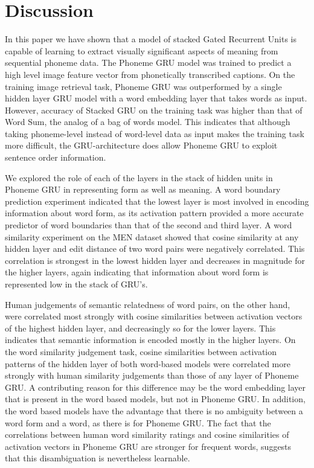 \section{Discussion}
\label{sec:discussion}
In this paper we have shown that a model of stacked Gated Recurrent Units is capable of learning to extract visually significant aspects of meaning from sequential phoneme data. The {\sc Phoneme GRU} model was trained to predict a high level image feature vector from phonetically transcribed captions. On the training image retrieval task, {\sc Phoneme GRU} was outperformed by a single hidden layer GRU model with a word embedding layer that takes words as input. However, accuracy of {\sc Stacked GRU} on the training task was higher than that of {\sc Word Sum}, the analog of a bag of words model. This indicates that although taking phoneme-level instead of word-level data as input makes the training task more difficult, the GRU-architecture does allow {\sc Phoneme GRU} to exploit sentence order information.

We explored the role of each of the layers in the stack of hidden units in {\sc Phoneme GRU} in representing form as well as meaning. A word boundary prediction experiment indicated that the lowest layer is most involved in encoding information about word form, as its activation pattern provided a more accurate predictor of word boundaries than that of the second and third layer. A word similarity experiment on the MEN dataset showed that cosine similarity at any hidden layer and edit distance of two word pairs were negatively correlated. This correlation is strongest in the lowest hidden layer and decreases in magnitude for the higher layers, again indicating that information about word form is represented low in the stack of GRU's.

Human judgements of semantic relatedness of word pairs, on the other hand, were correlated most strongly with cosine similarities between activation vectors of the highest hidden layer, and decreasingly so for the lower layers. This indicates that semantic information is encoded mostly in the higher layers. On the word similarity judgement task, cosine similarities between activation patterns of the hidden layer of both word-based models were correlated more strongly with human similarity judgements than those of any layer of {\sc Phoneme GRU}. A contributing reason for this difference may be the word embedding layer that is present in the word based models, but not in {\sc Phoneme GRU}. In addition, the word based models have the advantage that there is no ambiguity between a word form and a word, as there is for {\sc Phoneme GRU}. The fact that the correlations between human word similarity ratings and cosine similarities of activation vectors in {\sc Phoneme GRU} are stronger for frequent words, suggests that this disambiguation is nevertheless learnable.

